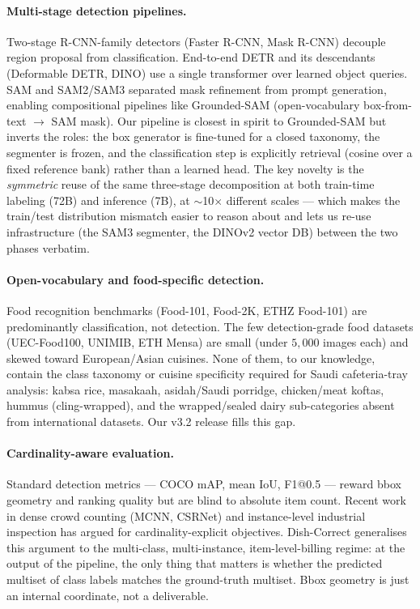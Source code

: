 \documentclass[10pt,twocolumn,letterpaper]{article}
\begin{document}
\paragraph{Multi-stage detection pipelines.} Two-stage R-CNN-family
detectors (Faster R-CNN, Mask R-CNN) decouple region proposal from
classification. End-to-end DETR and its descendants (Deformable DETR,
DINO) use a single transformer over learned object queries. SAM and
SAM2/SAM3 separated mask refinement from prompt generation, enabling
compositional pipelines like Grounded-SAM (open-vocabulary box-from-text
$\rightarrow$ SAM mask). Our pipeline is closest in spirit to
Grounded-SAM but inverts the roles: the box generator is fine-tuned for a
closed taxonomy, the segmenter is frozen, and the classification step is
explicitly retrieval (cosine over a fixed reference bank) rather than a
learned head. The key novelty is the \emph{symmetric} reuse of the same
three-stage decomposition at both train-time labeling (72B) and inference
(7B), at $\sim$10$\times$ different scales --- which makes the train/test
distribution mismatch easier to reason about and lets us re-use
infrastructure (the SAM3 segmenter, the DINOv2 vector DB) between the two
phases verbatim.

\paragraph{Open-vocabulary and food-specific detection.} Food recognition
benchmarks (Food-101, Food-2K, ETHZ Food-101) are predominantly
classification, not detection. The few detection-grade food datasets
(UEC-Food100, UNIMIB, ETH Mensa) are small (under $5{,}000$ images each)
and skewed toward European/Asian cuisines. None of them, to our knowledge,
contain the class taxonomy or cuisine specificity required for Saudi
cafeteria-tray analysis: kabsa rice, masakaah, asidah/Saudi porridge,
chicken/meat koftas, hummus (cling-wrapped), and the wrapped/sealed
dairy sub-categories absent from international datasets. Our v3.2 release
fills this gap.

\paragraph{Cardinality-aware evaluation.} Standard detection metrics ---
COCO mAP, mean IoU, F1@0.5 --- reward bbox geometry and ranking quality
but are blind to absolute item count. Recent work in dense crowd counting
(MCNN, CSRNet) and instance-level industrial inspection has argued for
cardinality-explicit objectives. Dish-Correct generalises this argument
to the multi-class, multi-instance, item-level-billing regime: at the
output of the pipeline, the only thing that matters is whether the
predicted multiset of class labels matches the ground-truth multiset. Bbox
geometry is just an internal coordinate, not a deliverable.
\end{document}
